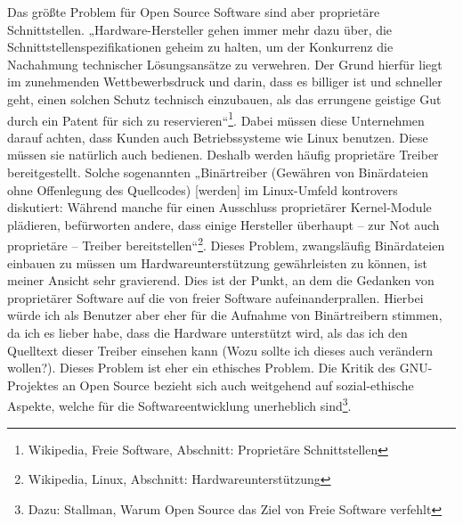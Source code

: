 \documentclass[a4paper,12pt]{article}
\begin{document}
Das größte Problem für Open Source Software sind aber proprietäre Schnittstellen. „Hardware-Hersteller gehen immer mehr dazu über, die Schnittstellenspezifikationen geheim zu halten, um der Konkurrenz die Nachahmung technischer Lösungsansätze zu verwehren. Der Grund hierfür liegt im zunehmenden Wettbewerbsdruck und darin, dass es billiger ist und schneller geht, einen solchen Schutz technisch einzubauen, als das errungene geistige Gut durch ein Patent für sich zu reservieren“\footnote{Wikipedia, Freie Software, Abschnitt: Proprietäre Schnittstellen}. Dabei müssen diese Unternehmen darauf achten, dass Kunden auch Betriebssysteme wie Linux benutzen. Diese müssen sie natürlich auch bedienen. Deshalb werden häufig proprietäre Treiber bereitgestellt. Solche sogenannten „Binärtreiber (Gewähren von Binärdateien ohne Offenlegung des Quellcodes) [werden] im Linux-Umfeld kontrovers diskutiert: Während manche für einen Ausschluss proprietärer Kernel-Module plädieren, befürworten andere, dass einige Hersteller überhaupt – zur Not auch proprietäre – Treiber bereitstellen“\footnote{Wikipedia, Linux, Abschnitt: Hardwareunterstützung}. Dieses Problem, zwangsläufig Binärdateien einbauen zu müssen um Hardwareunterstützung gewährleisten zu können, ist meiner Ansicht sehr gravierend. Dies ist der Punkt, an dem die Gedanken von proprietärer Software auf die von freier Software aufeinanderprallen. Hierbei würde ich als Benutzer aber eher für die Aufnahme von Binärtreibern stimmen, da ich es lieber habe, dass die Hardware unterstützt wird, als das ich den Quelltext dieser Treiber einsehen kann (Wozu sollte ich dieses auch verändern wollen?). Dieses Problem ist eher ein ethisches Problem. Die Kritik des GNU-Projektes an Open Source bezieht sich auch weitgehend auf sozial-ethische Aspekte, welche für die Softwareentwicklung unerheblich sind\footnote{Dazu: Stallman, Warum Open Source das Ziel von Freie Software verfehlt}.\\
\end{document}
